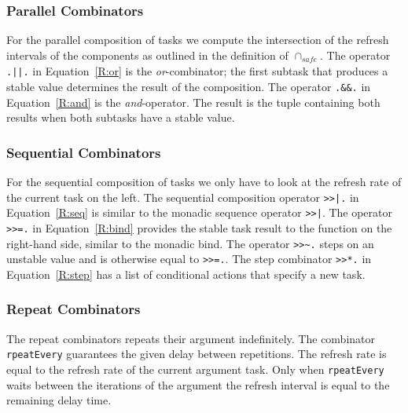 \documentclass[runningheads]{llncs}
\newcommand{\CleanInline}[1]{\lstinline[language=Clean]!#1!}
\newcommand{\prog}[1]{\CleanInline{#1}}
\begin{document}
\subsubsection{Parallel Combinators} For the parallel composition of tasks we compute the intersection of the refresh intervals of the components as outlined in the definition of $\cap_{\textit{safe}}$.
The operator \prog{.||.} in Equation~\ref{R:or} is the \emph{or}-combinator; the first subtask that produces a stable value determines the result of the composition.
The operator \prog{.&&.} in Equation~\ref{R:and} is the \emph{and}-operator. The result is the tuple containing both results when both subtasks have a stable value.

\subsubsection{Sequential Combinators} For the sequential composition of tasks we only have to look at the refresh rate of the current task on the left.
The sequential composition operator \prog{>>|.} in Equation~\ref{R:seq} is similar to the monadic sequence operator \prog{>>|}.
The operator \prog{>>=.} in Equation~\ref{R:bind} provides the stable task result to the function on the right-hand side, similar to the monadic bind.
The operator \prog{>>~.} steps on an unstable value and is otherwise equal to \prog{>>=.}.
The step combinator \prog{>>*.} in Equation~\ref{R:step} has a list of conditional actions that specify a new task.

\subsubsection{Repeat Combinators} The repeat combinators repeats their argument indefinitely.
The combinator \prog{rpeatEvery} guarantees the given delay between repetitions. The refresh rate is equal to the refresh rate of the current argument task.
Only when \prog{rpeatEvery} waits between the iterations of the argument the refresh interval is equal to the remaining delay time.
\end{document}
